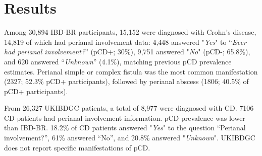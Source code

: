 

\section{Results}
Among 30,894 IBD-BR participants, 15,152 were diagnosed with Crohn's disease, 14,819 of which had perianal involvement data: 4,448 answered "\textit{Yes}" to “\textit{Ever had perianal involvement?}” (pCD+; 30\%), 9,751 answered "\textit{No}" (pCD-; 65.8\%), and 620 answered “\textit{Unknown}” (4.1\%), matching previous pCD prevalence estimates. Perianal simple or complex fistula was the most common manifestation (2327;  52.3\% pCD+ participants), followed by perianal abscess (1806; 40.5\% of pCD+ participants).

From 26,327 UKIBDGC patients, a total of 8,977 were diagnosed with CD. 7106 CD patients had perianal involvement information. pCD prevalence was lower than IBD-BR. 18.2\% of CD patients answered "\textit{Yes}" to the question “Perianal involvement?”, 61\% answered “No”, and 20.8\% answered "\textit{Unknown}". UKIBDGC does not report specific manifestations of pCD.

